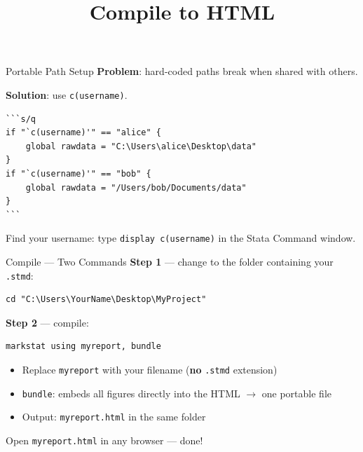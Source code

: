 \documentclass[dvipsnames,hyperref={pdfpagelabels=false}]{beamer}
\begin{document}
\begin{frame}[fragile]{Portable Path Setup}
  \textbf{Problem}: hard-coded paths break when shared with others.

  \textbf{Solution}: use \texttt{c(username)}.

  \begin{lstlisting}
```s/q
if "`c(username)'" == "alice" {
    global rawdata = "C:\Users\alice\Desktop\data"
}
if "`c(username)'" == "bob" {
    global rawdata = "/Users/bob/Documents/data"
}
```
  \end{lstlisting}

  \vspace{0.5em}
  Find your username: type
  \texttt{display \textasciigrave c(username)\textquotesingle}
  in the Stata Command window.
\end{frame}

\title[]{Compile to HTML}
\author{}\institute{}\date{}
\begin{frame}{}
  \titlepage
\end{frame}

\begin{frame}[fragile]{Compile --- Two Commands}
  \textbf{Step 1} --- change to the folder containing your \texttt{.stmd}:
  \begin{lstlisting}
cd "C:\Users\YourName\Desktop\MyProject"
  \end{lstlisting}

  \textbf{Step 2} --- compile:
  \begin{lstlisting}
markstat using myreport, bundle
  \end{lstlisting}

  \begin{itemize}
    \item Replace \texttt{myreport} with your filename (\textbf{no} \texttt{.stmd} extension)
    \item \texttt{bundle}: embeds all figures directly into the HTML $\to$ one portable file
    \item Output: \texttt{myreport.html} in the same folder
  \end{itemize}

  \vspace{0.5em}
  \begin{center}
    \alert{Open \texttt{myreport.html} in any browser --- done!}
  \end{center}
\end{frame}
\end{document}

